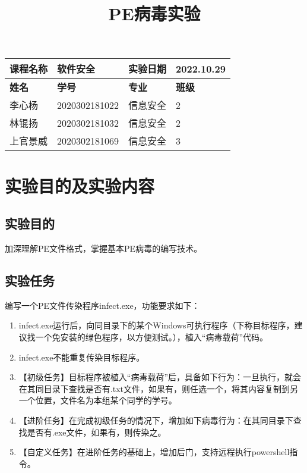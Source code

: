 \documentclass[UTF8]{ctexart}
\begin{document}
	\title{PE病毒实验}
	\author{}
	\date{\vspace{-8ex}}
	\maketitle
	\begin{table}[h]
		\centering
		
		\begin{tabular}{|p{2.5cm}<{\centering}|p{4.5cm}<{\centering}|p{3cm}<{\centering}|p{2.5cm}<{\centering}|}
			\hline
			\textbf{课程名称} & 软件安全         & \textbf{实验日期} & 2022.10.29   \\ \hline
			\textbf{姓名}   & \textbf{学号}   & \textbf{专业}   & \textbf{班级} \\ \hline
			李心杨           & 2020302181022 & 信息安全          & 2           \\
			林锟扬           & 2020302181032 & 信息安全          & 2           \\
			上官景威      &  2020302181069 & 信息安全          & 3           \\ \hline
		\end{tabular}
	\end{table}
	\tableofcontents
	\pagebreak
	
	\section{实验目的及实验内容}
	\subsection{实验目的}
	加深理解PE文件格式，掌握基本PE病毒的编写技术。
	\subsection{实验任务}
	编写一个PE文件传染程序infect.exe，功能要求如下：
	\begin{enumerate}
		\item
		infect.exe运行后，向同目录下的某个Windows可执行程序（下称目标程序，建议找一个免安装的绿色程序，以方便测试。），植入“病毒载荷”代码。
		\item infect.exe不能重复传染目标程序。
		
		\item【初级任务】目标程序被植入“病毒载荷”后，具备如下行为：一旦执行，就会在其同目录下查找是否有.txt文件，如果有，则任选一个，将其内容复制到另一个位置，文件名为本组某个同学的学号。
		\item【进阶任务】在完成初级任务的情况下，增加如下病毒行为：在其同目录下查找是否有.exe文件，如果有，则传染之。
		\item【自定义任务】在进阶任务的基础上，增加后门，支持远程执行powershell指令。
	\end{enumerate}
\end{document}
